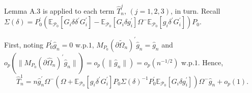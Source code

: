 \documentclass[hidelinks, 11 pt, a4paper, pdflatex]{article}
\begin{document}
{   Lemma A.3 is applied to each term $\hat{T}_{n}^{j}$, $(j=1,2,3)$, in turn. Recall $\Sigma(\delta) = P_{0}^{\prime}(\mathbb{E}_{\mathcal{P}_{0}}[G_{i}\delta \delta^{\prime}G_{i}^{\prime}] - \mathbb{E}_{\mathcal{P}_{0}}[G_{i}\delta g_{i}^{\prime}]\Omega^{-}\mathbb{E}_{\mathcal{P}_{0}}[g_{i}\delta^{\prime}G_{i}^{\prime}])P_{0}$.

   First, noting $P_{0}^{\prime}\hat{g}_{n} = 0$ w.p.$1$, $M_{P_{0}}(\partial \tilde{\Omega}_{n})^{\prime}\hat{g}_{n} = \hat{g}_{n}$ and $o_{p}(\|M_{P_{0}}(\partial \hat{\Omega}_{n})^{\prime}\hat{g}_{n}\|) = o_{p}(\|\hat{g}_{n}\|) = o_{p}(n^{-1/2})$ w.p.$1$. Hence,
    \begin{equation}
     \hat{T}_{n}^{1} = n\hat{g}_{n}^{\prime}\Omega^{-}
                        (\Omega + \mathbb{E}_{\mathcal{P}_{0}}[g_{i}\delta^{\prime}G_{i}^{\prime}]
                         P_{0}\Sigma(\delta)^{-1}P_{0}^{\prime}
                         \mathbb{E}_{\mathcal{P}_{0}}[G_{i}\delta g_{i}^{\prime}])
                        \Omega^{-}\hat{g}_{n}
                       + o_{p}(1).  \label{B.1}
    \end{equation}

}
\end{document}

